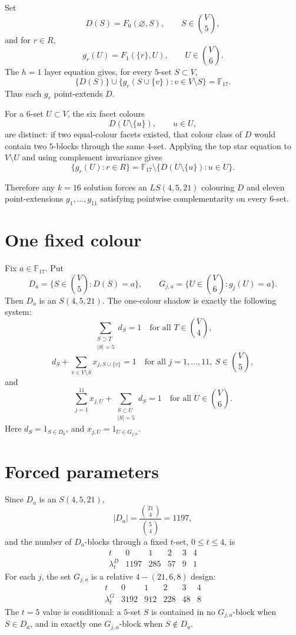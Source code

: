 \documentclass[11pt]{article}
\newcommand{\binomV}[2]{\binom{#1}{#2}}
\newcommand{\F}{\mathbb F_{17}}
\begin{document}
Set
\[
  D(S)=F_0(\varnothing,S),\qquad S\in\binomV{V}{5},
\]
and for \(r\in R\),
\[
  g_r(U)=F_1(\{r\},U),\qquad U\in\binomV{V}{6}.
\]
The \(h=1\) layer equation gives, for every \(5\)-set \(S\subset V\),
\[
  \{D(S)\}\cup\{g_r(S\cup\{v\}):v\in V\setminus S\}=\F.
\]
Thus each \(g_r\) point-extends \(D\).

For a \(6\)-set \(U\subset V\), the six facet colours
\[
  D(U\setminus\{u\}),\qquad u\in U,
\]
are distinct: if two equal-colour facets existed, that colour class of \(D\)
would contain two \(5\)-blocks through the same \(4\)-set.  Applying the top
star equation to \(V\setminus U\) and using complement invariance gives
\[
  \{g_r(U):r\in R\}
  =
  \F\setminus\{D(U\setminus\{u\}):u\in U\}.
\]

Therefore any \(k=16\) solution forces an \(LS(4,5,21)\) colouring \(D\) and
eleven point-extensions \(g_1,\ldots,g_{11}\) satisfying pointwise
complementarity on every \(6\)-set.

\section*{One fixed colour}

Fix \(a\in\F\).  Put
\[
  D_a=\{S\in\binomV{V}{5}:D(S)=a\},
  \qquad
  G_{j,a}=\{U\in\binomV{V}{6}:g_j(U)=a\}.
\]
Then \(D_a\) is an \(S(4,5,21)\).  The one-colour shadow is exactly the
following system:
\[
  \sum_{\substack{S\supset T\\ |S|=5}} d_S=1
  \quad\text{for all }T\in\binomV{V}{4},
\]
\[
  d_S+\sum_{v\in V\setminus S}x_{j,S\cup\{v\}}=1
  \quad\text{for all }j=1,\ldots,11,\ S\in\binomV{V}{5},
\]
and
\[
  \sum_{j=1}^{11}x_{j,U}
  +\sum_{\substack{S\subset U\\ |S|=5}}d_S=1
  \quad\text{for all }U\in\binomV{V}{6}.
\]
Here \(d_S=1_{S\in D_a}\), and \(x_{j,U}=1_{U\in G_{j,a}}\).

\section*{Forced parameters}

Since \(D_a\) is an \(S(4,5,21)\),
\[
  |D_a|=\frac{\binom{21}{4}}{\binom{5}{4}}=1197,
\]
and the number of \(D_a\)-blocks through a fixed \(t\)-set, \(0\le t\le4\), is
\[
\begin{array}{c|ccccc}
t&0&1&2&3&4\\
\hline
\lambda_t^D&1197&285&57&9&1
\end{array}
\]
For each \(j\), the set \(G_{j,a}\) is a relative \(4-(21,6,8)\) design:
\[
\begin{array}{c|ccccc}
t&0&1&2&3&4\\
\hline
\lambda_t^G&3192&912&228&48&8
\end{array}
\]
The \(t=5\) value is conditional: a \(5\)-set \(S\) is contained in no
\(G_{j,a}\)-block when \(S\in D_a\), and in exactly one \(G_{j,a}\)-block when
\(S\notin D_a\).
\end{document}
